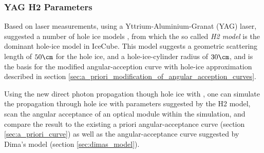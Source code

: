 %
%
%
%
%
%
\subsubsection{YAG H2 Parameters}
\label{sec:yag_h2_parameters}
Based on laser measurements, using a Yttrium-Aluminium-Granat (YAG) laser,  suggested a number of hole ice models \cite{holeicestudieswithyag}, from which the so called \textit{H2 model} is the dominant hole-ice model in IceCube. This model suggests a geometric scattering length of $50\cm$ for the hole ice, and a hole-ice-cylinder radius of $30\cm$, and is the basis for the modified angular-acception curve with hole-ice approximation described in section \ref{sec:a_priori_modification_of_angular_acception_curves}.

Using the new direct photon propagation though hole ice with \clsim, one can simulate the propagation through hole ice with parameters suggested by the H2 model, scan the angular acceptance of an optical module within the simulation, and compare the result to the existing a priori angular-acceptance curve (section \ref{sec:a_priori_curve}) as well as the angular-acceptance curve suggested by Dima's model (section \ref{sec:dimas_model}).

